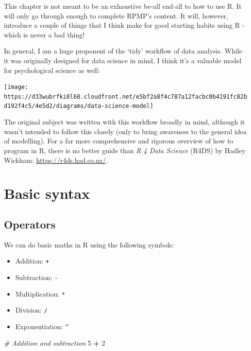 \documentclass[
]{book}
\newenvironment{Shaded}{\begin{snugshade}}{\end{snugshade}}
\newcommand{\CommentTok}[1]{\textcolor[rgb]{0.56,0.35,0.01}{\textit{#1}}}
\newcommand{\DecValTok}[1]{\textcolor[rgb]{0.00,0.00,0.81}{#1}}
\newcommand{\SpecialCharTok}[1]{\textcolor[rgb]{0.81,0.36,0.00}{\textbf{#1}}}
\begin{document}
This chapter is not meant to be an exhaustive be-all end-all to how to use R. It will only go through enough to complete RPMP's content. It will, however, introduce a couple of things that I think make for good starting habits using R - which is never a bad thing!

In general, I am a huge proponent of the `tidy' workflow of data analysis. While it was originally designed for data science in mind, I think it's a valuable model for psychological science as well:

\begin{center}\texttt{[image: https://d33wubrfki0l68.cloudfront.net/e5bf2a8f4c787a12facbc0b4191fc82bd192f4c5/4e5d2/diagrams/data-science-model]} \end{center}

The original subject was written with this workflow broadly in mind, although it wasn't intended to follow this closely (only to bring awareness to the general idea of modelling). For a far more comprehensive and rigorous overview of how to program in R, there is no better guide than \emph{R 4 Data Science} (R4DS) by Hadley Wickham: \url{https://r4ds.had.co.nz/}.

\hypertarget{basic-syntax}{%
\section{Basic syntax}\label{basic-syntax}}

\hypertarget{operators}{%
\subsection{Operators}\label{operators}}

We can do basic maths in R using the following symbols:

\begin{itemize}
\item
  Addition: \texttt{+}
\item
  Subtraction: \texttt{-}
\item
  Multiplication: \texttt{*}
\item
  Division: \texttt{/}
\item
  Exponentiation: \texttt{\^{}}
\end{itemize}

\begin{Shaded}
\begin{Highlighting}[]
\CommentTok{\# Addition and subtraction}
\DecValTok{5} \SpecialCharTok{+} \DecValTok{2}
\end{Highlighting}
\end{Shaded}
\end{document}
